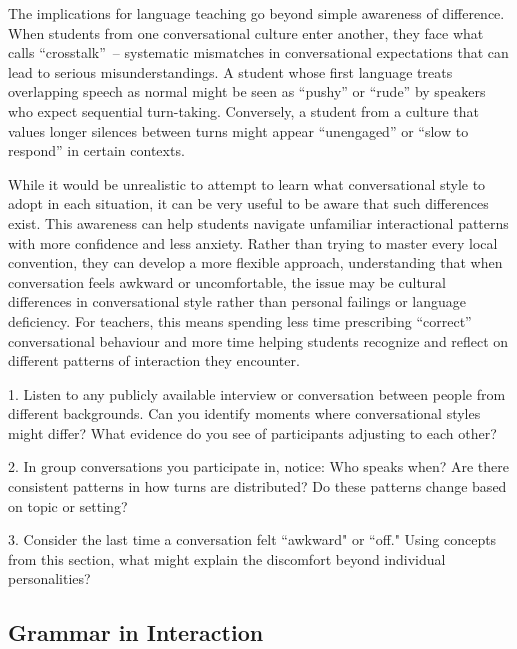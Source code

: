 The implications for language teaching go beyond simple awareness of difference. When students from one conversational culture enter another, they face what \citet{gumperz1982} calls ``crosstalk''~-- systematic mismatches in conversational expectations that can lead to serious misunderstandings. A student whose first language treats overlapping speech as normal might be seen as ``pushy'' or ``rude'' by speakers who expect sequential turn-taking. Conversely, a student from a culture that values longer silences between turns might appear ``unengaged'' or ``slow to respond'' in certain contexts.

While it would be unrealistic to attempt to learn what conversational style to adopt in each situation, it can be very useful to be aware that such differences exist. This awareness can help students navigate unfamiliar interactional patterns with more confidence and less anxiety. Rather than trying to master every local convention, they can develop a more flexible approach, understanding that when conversation feels awkward or uncomfortable, the issue may be cultural differences in conversational style rather than personal failings or language deficiency. For teachers, this means spending less time prescribing ``correct'' conversational behaviour and more time helping students recognize and reflect on different patterns of interaction they encounter.

\begin{tcolorbox}[title=Exercise: Cultural Patterns in Action, colback=white, colframe=red!75!black, fonttitle=\bfseries]
1. Listen to any publicly available interview or conversation between people from different backgrounds. Can you identify moments where conversational styles might differ? What evidence do you see of participants adjusting to each other?

2. In group conversations you participate in, notice: Who speaks when? Are there consistent patterns in how turns are distributed? Do these patterns change based on topic or setting?

3. Consider the last time a conversation felt ``awkward" or ``off." Using concepts from this section, what might explain the discomfort beyond individual personalities?
\end{tcolorbox}

\subsection{Grammar in Interaction} \label{subsec:grammar-interaction}

